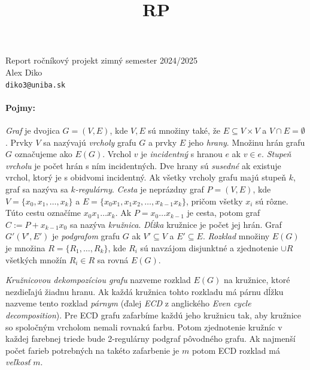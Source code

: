 \documentclass[11pt]{article}
\begin{document}
\title{RP}
\begin{center}
    {\LARGE Report ročníkový projekt zimný semester 2024/2025}\\[1em]
    {\large Alex Diko  \\ \texttt{diko3@uniba.sk}}\\[1em]
\end{center}

\paragraph{Pojmy:}

\textit{Graf} je dvojica $G = (V,E)$, kde $V,E$ sú množiny také, že $E \subseteq V\times V$
a $V \cap E = \emptyset$. Prvky $V$ sa nazývajú \textit{vrcholy} grafu $G$ a prvky $E$ jeho \textit{hrany}.
Množinu hrán grafu $G$ označujeme ako $E(G)$. Vrchol 
$v$ je \textit{incidentný} s hranou $e$ ak $v\in e$. \textit{Stupeň vrcholu} je počet
hrán s ním incidentných. Dve hrany sú \textit{susedné} ak existuje vrchol, ktorý je 
s obidvomi incidentný. Ak všetky vrcholy grafu
majú stupeň $k$, graf sa nazýva sa \textit{$k$-regulárny}. \textit{Cesta} je neprázdny graf $P = (V,E)$,
kde $V = \{x_0, x_1, \ldots, x_k\}$ a $E = \{x_0x_1, x_1x_2, \ldots, x_{k-1}x_k\}$,
pričom všetky $x_i$ sú rôzne. Túto cestu označíme $x_0x_1\ldots x_k$. Ak $P = x_0\ldots x_{k-1}$ je cesta, potom
graf $C := P + x_{k-1}x_0$ sa nazýva \textit{kružnica}. \textit{Dĺžka} kružnice je počet jej hrán. Graf
$ G'(V',E')$ je \textit{podgrafom} grafu $G$ ak $V' \subseteq V$ a $E' \subseteq E$.
\textit{Rozklad} množiny $E(G)$ je množina $R = \{R_1, \ldots, R_k\}$, kde $R_i$
sú navzájom disjunktné a zjednotenie $\cup R$ všetkých množín $R_i \in R$ sa rovná $E(G)$. \cite{diestel2024graph}

\textit{Kružnicovou dekompozíciou grafu} nazveme rozklad $E(G)$ na kružnice, ktoré nezdieľajú žiadnu
hranu. Ak každá kružnica tohto rozkladu má párnu dĺžku nazveme tento rozklad \textit{párnym} (ďalej
\textit{ECD} z anglického \textit{Even cycle decomposition}).
Pre ECD grafu zafarbíme každú jeho kružnicu tak, aby kružnice so spoločným
vrcholom nemali rovnakú farbu. Potom zjednotenie kružníc v každej farebnej triede 
bude 2-regulárny podgraf pôvodného grafu. Ak najmenší počet farieb potrebných 
na takéto zafarbenie je $m$ potom ECD rozklad má \textit{veľkosť} $m$. \cite{MALNEGRO2024113844}
\end{document}
